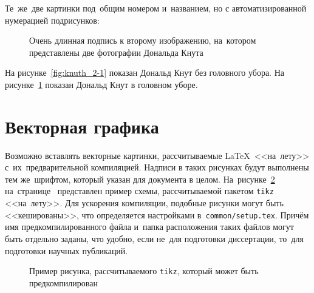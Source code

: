 Те~же~две картинки под~общим номером и~названием,
но с автоматизированной нумерацией подрисунков:
\begin{figure}[ht]
    \caption[Этот текст попадает в названия рисунков в списке рисунков]{Очень
        длинная подпись к второму изображению, на~котором представлены две
        фотографии Дональда Кнута}\label{fig:knuth_2}
\end{figure}

На рисунке~\cref{fig:knuth_2-1} показан Дональд Кнут без головного убора.
На рисунке~\cref{fig:knuth_2}
показан Дональд Кнут в головном уборе.

\section{Векторная графика}\label{sec:ch2/vector}

Возможно вставлять векторные картинки, рассчитываемые \LaTeX\ <<на~лету>>
с~их~предварительной компиляцией. Надписи в таких рисунках будут выполнены
тем же~шрифтом, который указан для документа в целом.
На~рисунке~\cref{fig:tikz_example} на~странице~\pageref{fig:tikz_example}
представлен пример схемы, рассчитываемой пакетом \verb|tikz| <<на~лету>>.
Для ускорения компиляции, подобные рисунки могут быть <<кешированы>>, что
определяется настройками в~\verb|common/setup.tex|.
Причём имя предкомпилированного
файла и~папка расположения таких файлов могут быть отдельно заданы,
что удобно, если не~для подготовки диссертации,
то~для подготовки научных публикаций.
\begin{figure}[ht]
    \legend{}
    \caption[Пример \texttt{tikz} схемы]{Пример рисунка, рассчитываемого
        \texttt{tikz}, который может быть предкомпилирован}\label{fig:tikz_example}
\end{figure}


